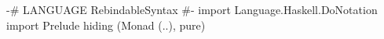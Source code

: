\begin{code}
{-# LANGUAGE RebindableSyntax #-}
import Language.Haskell.DoNotation
import Prelude hiding (Monad (..), pure)
\end{code}
